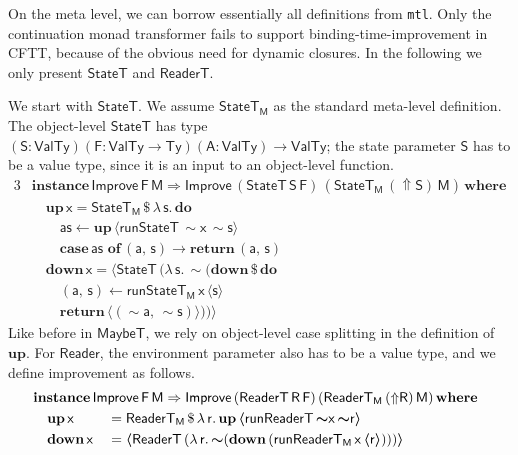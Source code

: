 \documentclass[acmsmall]{acmart}
\newcommand{\mit}[1]{{\mathsf{#1}}}
\newcommand{\msf}[1]{{\mathsf{#1}}}
\newcommand{\mbf}[1]{{\mathbf{#1}}}
\newcommand{\bs}[1]{\boldsymbol{#1}}
\newcommand{\mdo}{\mbf{do}\,}
\newcommand{\ind}{\hspace{1em}}
\newcommand{\return}{\mbf{return}\,}
\newcommand{\lam}{\lambda\,}
\newcommand{\where}{\mbf{where}}
\newcommand{\M}{\msf{M}}
\newcommand{\of}{\mbf{of}\,}
\newcommand{\vA}{\mathsf{A}}
\newcommand{\vS}{\mathsf{S}}
\newcommand{\vF}{\mathsf{F}}
\newcommand{\vR}{\mathsf{R}}
\newcommand{\vM}{\mathsf{M}}
\newcommand{\va}{\mathsf{a}}
\newcommand{\vx}{\mathsf{x}}
\newcommand{\vs}{\mathsf{s}}
\newcommand{\vr}{\mathsf{r}}
\newcommand{\Reader}{\msf{Reader}}
\newcommand{\ReaderT}{\msf{ReaderT}}
\newcommand{\fro}{\leftarrow}
\newcommand{\case}{\mbf{case\,}}
\newcommand{\Up}{{\Uparrow}}
\newcommand{\spl}{{\bs{\sim}}}
\newcommand{\ql}{{\bs{\langle}}}
\newcommand{\qr}{{\bs{\rangle}}}
\newcommand{\VTy}{\msf{ValTy}}
\newcommand{\Ty}{\msf{Ty}}
\newcommand{\MaybeT}{\msf{MaybeT}}
\theoremstyle{remark}
\newcommand{\mup}{\mbf{up}}
\newcommand{\mdown}{\mbf{down}}
\newcommand{\instance}{\mbf{instance}\,}
\newcommand{\Improve}{\msf{Improve}}
\newcommand{\qt}[1]{\ql#1\qr}
\newcommand{\RA}{\Rightarrow}
\newcommand{\StateT}{\msf{StateT}}
\newcommand{\runReaderT}{\mit{runReaderT}}
\newcommand{\runStateT}{\mit{runStateT}}
\newcommand{\dlr}{\,\$\,}
\begin{document}
On the meta level, we can borrow essentially all definitions from
\texttt{mtl}. Only the continuation monad transformer fails to support
binding-time-improvement in CFTT, because of the obvious need for dynamic
closures. In the following we only present $\StateT$ and $\ReaderT$.

We start with $\StateT$. We assume $\StateT_\M$ as the standard meta-level
definition. The object-level $\StateT$ has type $(\vS : \VTy)(\vF : \VTy \to
\Ty)(\vA : \VTy) \to \VTy$; the state parameter $\vS$ has to be a value type,
since it is an input to an object-level function.
\begin{alignat*}{3}
  &\instance \Improve\,\vF\,\vM \RA \Improve\,(\StateT\,\vS\,\vF)\,(\StateT_\M\,(\Up \vS)\,\vM)\,\where\\
  &\ind \mup\,\vx = \StateT_\M \dlr \lam \vs.\,\mdo\\
  &\ind\ind \mit{as} \fro \mup\,\qt{\runStateT\,\spl \vx\,\spl \vs}\\
  &\ind\ind \case \mit{as}\,\,\of (\va,\,\vs) \to \return (\va,\,\vs)\\
  &\ind \mdown\,\vx = \qt{ \StateT\,(\lam \vs.\, \spl(\mdown \dlr \mdo\\\
  &\ind \ind (\va,\,\vs) \fro \runStateT_\M\,\vx\,\qt{\vs}\\
  &\ind \ind \return \qt{(\spl \va,\, \spl \vs)}))}
\end{alignat*}
Like before in $\MaybeT$, we rely on object-level case splitting in the
definition of $\mup$. For $\Reader$, the environment parameter also has to be a
value type, and we define improvement as follows.
\begin{alignat*}{3}
  &\hspace{-5em}\mathrlap{\instance \Improve\,\vF\,\vM \RA \Improve\,(\ReaderT\,\vR\,\vF)\,(\ReaderT_\M\,(\Up \vR)\,\vM)\,\where}\\
  &\hspace{-5em}\ind \mup\,\vx   &&= \ReaderT_\M \dlr \lam \vr.\, \mup\,\qt{\runReaderT\,\spl \vx\,\spl \vr}\\
  &\hspace{-5em}\ind \mdown\,\vx &&= \qt{\ReaderT\,(\lam \vr.\,\spl(\mdown\,(\runReaderT_\M\,\vx\,\qt{\vr})))}
\end{alignat*}
\end{document}
